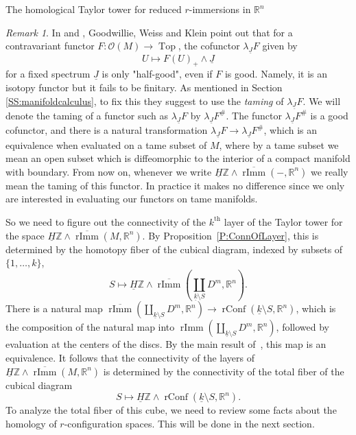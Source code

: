 \documentclass[12pt]{amsart}
\newcommand{\R}{{\mathbb R}}
\newcommand{\Z}{{\mathbb Z}}
\newcommand{\rImm}{\operatorname{rImm}}
\newcommand{\rbar}{\overline{\rImm}}
\newcommand{\rConf}{\operatorname{rConf}}
\newcommand{\HZ}{\underline{H}\Z}
\newcommand{\Top}{\operatorname{Top}}
\theoremstyle{plain}
\theoremstyle{definition}
\theoremstyle{remark}
\newtheorem{rem}[thm]{Remark}
\begin{document}
\begin{section}{The homological Taylor tower for reduced $r$-immersions in $\mathbb R^n$}
\begin{rem}
In \cite{GKW:EmbDisjSurg} and \cite{W:HomEmb}, Goodwillie, Weiss and Klein point out that for a contravariant functor $F: \mathcal{O}(M) \rightarrow \Top$, the cofunctor $\lambda_{\underline{J}}F$ given by $$U \mapsto F(U)_+ \wedge \underline{J}$$ for a fixed spectrum $\underline{J}$ is only "half-good", even if $F$ is good. Namely, it is an isotopy functor but it fails to be finitary. As mentioned in Section \ref{SS:manifoldcalculus}, to fix this they suggest to use the {\it taming} of $\lambda_{\underline{J}}F$. We will denote the taming of a functor such as $\lambda_{\underline{J}}F$ by $\lambda_{\underline{J}}F^\#$. The functor $\lambda_{\underline{J}}F^\#$ is a good cofunctor, and there is a natural transformation $\lambda_{\underline{J}}F\to \lambda_{\underline{J}}F^\#$, which is an equivalence when evaluated on a tame subset of $M$, where by a tame subset we mean an open subset which is diffeomorphic to the interior of a compact manifold with boundary. From now on, whenever we write $\HZ\wedge \overline{\rImm}(-,\R^n)$ we really mean the taming of this functor. In practice it makes no difference since we only are interested in evaluating our functors on tame manifolds.
\end{rem}

So we need to figure out the connectivity of the $k^{\text{th}}$ layer of the Taylor tower for the space $\HZ\wedge \overline{\rImm}(M,\R^n)$. 
By Proposition~\ref{P:ConnOfLayer}, this is determined by the homotopy fiber of the cubical diagram, indexed by subsets of $\{1, \ldots, k\}$,
\begin{equation*}
S\mapsto \HZ \wedge \rbar\left(\coprod_{\underline{k} \setminus S} D^m, \R^n\right).
\end{equation*}
There is a natural map $\rbar(\coprod_{\underline{k} \setminus S} D^m, \R^n)\to \rConf(\underline{k} \setminus S, \R^n)$, which is the composition of the natural map into $\rImm(\coprod_{\underline{k} \setminus S} D^m, \R^n)$, followed by evaluation at the centers of the discs. By the main result of~\cite{AS:rimmrconf}, this map is an equivalence. It follows that the connectivity of the layers of $\HZ\wedge \overline{\rImm}(M,\R^n)$ is determined by the connectivity of the total fiber of the cubical diagram
\begin{equation*}
S\mapsto \HZ \wedge \rConf(\underline{k} \setminus S, \R^n).
\end{equation*}
To analyze the total fiber of this cube, we need to review some facts about the homology of $r$-configuration spaces. This will be done in the next section.

\end{section}
\end{document}
